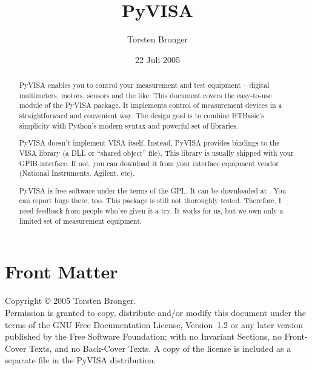 \documentclass{howto}
\title{PyVISA}
\author{Torsten Bronger}
\date{22 Juli 2005}
\begin{document}
\maketitle

\ifhtml
\chapter*{Front Matter\label{front}}
\fi

Copyright \copyright{} 2005 Torsten Bronger.\\
Permission is granted to copy, distribute and/or modify this document under the
terms of the GNU Free Documentation License, Version~1.2 or any later version
published by the Free Software Foundation; with no Invariant Sections, no
Front-Cover Texts, and no Back-Cover Texts.  A copy of the license is included
as a separate file  in the PyVISA distribution.

\begin{abstract}

\noindent
PyVISA enables you to control your measurement and test equipment -- digital
multimeters, motors, sensors and the like.  This document covers the
easy-to-use  module of the PyVISA package.  It implements control
of measurement devices in a straightforward and convenient way.  The design
goal is to combine HTBasic's simplicity with Python's modern syntax and
powerful set of libraries.

PyVISA doesn't implement VISA itself.  Instead, PyVISA provides bindings to the
VISA library (a DLL or ``shared object'' file).  This library is usually
shipped with your GPIB interface.  If not, you can download it from your
interface equipment vendor (National Instruments, Agilent, etc).

PyVISA is free software under the terms of the GPL\@.  It can be downloaded at
.  You can
report bugs there, too.  This package is still not thoroughly tested.
Therefore, I need feedback from people who've given it a try.  It works for us,
but we own only a limited set of measurement equipment.
\end{abstract}

\begin{samepage}
  \tableofcontents
\end{samepage}

\end{document}
